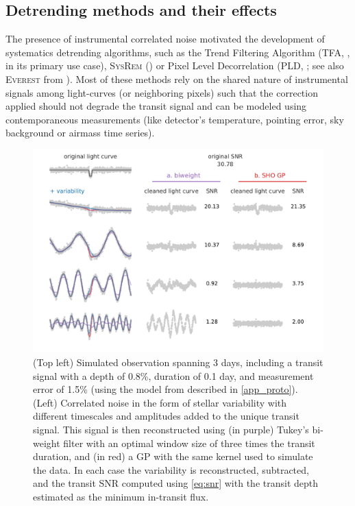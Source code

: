 \documentclass[modern]{aastex631}
\begin{document}
\subsection{Detrending methods and their effects}\label{detrending_effect}
The presence of instrumental correlated noise motivated the development of systematics detrending algorithms, such as the Trend Filtering Algorithm (\textsc{TFA}, \citealt{tfa}, in its primary use case), \textsc{SysRem} (\citealt{sysrem}) or Pixel Level Decorrelation (\textsc{PLD}, \citealt{pld}; see also \textsc{Everest} from \citealt{everest1, everest2}). Most of these methods rely on the shared nature of instrumental signals among light-curves (or neighboring pixels) such that the correction applied should not degrade the transit signal and can be modeled using contemporaneous measurements (like detector's temperature, pointing error, sky background or airmass time series).
\begin{figure}[H]
    \begin{centering}
        \includegraphics[width=\linewidth]{../workflows/plot_issues/figures/issue2.pdf}
        \caption{(Top left) Simulated observation spanning 3 days, including a transit signal with a depth of 0.8\%, duration of 0.1 day, and measurement error of 1.5\% (using the model from \cite{protopapas} described in \autoref{app_proto}). (Left) Correlated noise in the form of stellar variability with different timescales and amplitudes added to the unique transit signal. This signal is then reconstructed using (in purple) Tukey's bi-weight filter \citep{wotan} with an optimal window size of three times the transit duration, and (in red) a GP with the same kernel used to simulate the data. In each case the variability is reconstructed, subtracted, and the transit SNR computed using \autoref{eq:snr} with the transit depth estimated as the minimum in-transit flux.}
        \label{fig:issue2}
    \end{centering}
\end{figure}
\end{document}
